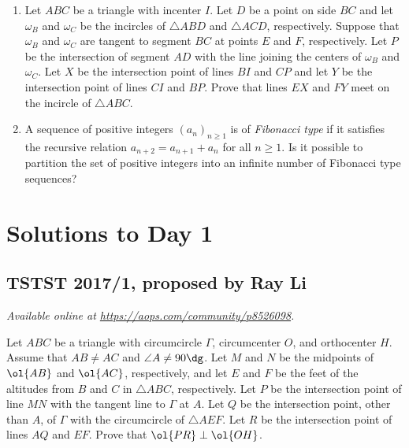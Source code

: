 \documentclass[11pt]{scrartcl}
\begin{document}
\begin{enumerate}[\bfseries 1.]
\item %
Let $ABC$ be a triangle with incenter $I$.
Let $D$ be a point on side $BC$ and let $\omega_B$ and $\omega_C$
be the incircles of $\triangle ABD$ and $\triangle ACD$, respectively.
Suppose that $\omega_B$ and $\omega_C$ are tangent to segment $BC$
at points $E$ and $F$, respectively.
Let $P$ be the intersection of segment $AD$ with the
line joining the centers of $\omega_B$ and $\omega_C$.
Let $X$ be the intersection point of lines $BI$ and $CP$
and let $Y$ be the intersection point of lines $CI$ and $BP$.
Prove that lines $EX$ and $FY$ meet on the incircle of $\triangle ABC$.

\item %
A sequence of positive integers $(a_{n})_{n \geq 1}$ is of
\emph{Fibonacci type} if it satisfies the recursive relation
$a_{n+2}=a_{n+1}+a_{n}$ for all $n \geq 1$.
Is it possible to partition the set of positive integers
into an infinite number of Fibonacci type sequences?

\end{enumerate}
\pagebreak

\section{Solutions to Day 1}
\subsection{TSTST 2017/1, proposed by Ray Li}
\textsl{Available online at \url{https://aops.com/community/p8526098}.}
\begin{mdframed}[style=mdpurplebox,frametitle={Problem statement}]
Let $ABC$ be a triangle with circumcircle $\Gamma$,
circumcenter $O$, and orthocenter $H$.
Assume that $AB \neq AC$ and $\angle A \neq 90\dg$.
Let $M$ and $N$ be the midpoints of $\ol{AB}$ and $\ol{AC}$,
respectively, and let $E$ and $F$ be the feet of the altitudes
from $B$ and $C$ in $\triangle ABC$, respectively.
Let $P$ be the intersection point of line $MN$
with the tangent line to $\Gamma$ at $A$.
Let $Q$ be the intersection point,
other than $A$, of $\Gamma$ with the circumcircle of $\triangle AEF$.
Let $R$ be the intersection point of lines $AQ$ and $EF$.
Prove that $\ol{PR} \perp \ol{OH}$.
\end{mdframed}
\end{document}
